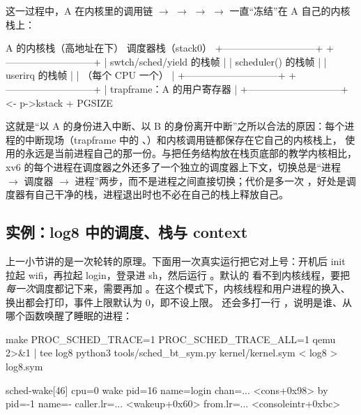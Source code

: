 这一过程中，A 在内核里的调用链  $\to$  $\to$  $\to$  $\to$  一直“冻结”在 A 自己的内核栈上：

\begin{txtcode}
A 的内核栈（高地址在下）            调度器栈（stack0）
+-----------------------------+    +---------------------------+
| swtch/sched/yield 的栈帧    |    | scheduler() 的栈帧        |
| userirq 的栈帧              |    | （每个 CPU 一个）         |
+-----------------------------+    +---------------------------+
| trapframe：A 的用户寄存器   |
+-----------------------------+ <- p->kstack + PGSIZE
\end{txtcode}

这就是“以 A 的身份进入中断、以 B 的身份离开中断”之所以合法的原因：每个进程的中断现场（trapframe 中的 、）和内核调用链都保存在它自己的内核栈上， 使用的永远是当前进程自己的那一份。与把任务结构放在栈页底部的教学内核相比，xv6 的每个进程在调度器之外还多了一个独立的调度器上下文，切换总是“进程 $\to$ 调度器 $\to$ 进程”两步，而不是进程之间直接切换；代价是多一次 ，好处是调度器有自己干净的栈，进程退出时也不必在自己的栈上释放自己。

\subsection{实例：log8 中的调度、栈与 context}
\label{sec:sched-log8}

上一小节讲的是一次轮转的原理。下面用一次真实运行把它对上号：开机后 init 拉起 wifi，再拉起 login，登录进 sh，然后运行 。默认的  看不到内核线程，要把\emph{每一次}调度都记下来，需要再加 。在这个模式下，内核线程和用户进程的换入、换出都会打印，事件上限默认为 0，即不设上限。 还会多打一行 ，说明是谁、从哪个函数唤醒了睡眠的进程：

\begin{shcode}
make PROC_SCHED_TRACE=1 PROC_SCHED_TRACE_ALL=1 qemu 2>&1 | tee log8
python3 tools/sched_bt_sym.py kernel/kernel.sym < log8 > log8.sym
\end{shcode}

\begin{txtcode}
sched-wake[46] cpu=0 wake pid=16 name=login chan=... <cons+0x98> by pid=-1 name=-
               caller.lr=... <wakeup+0x60> from.lr=... <consoleintr+0xbc>
\end{txtcode}

